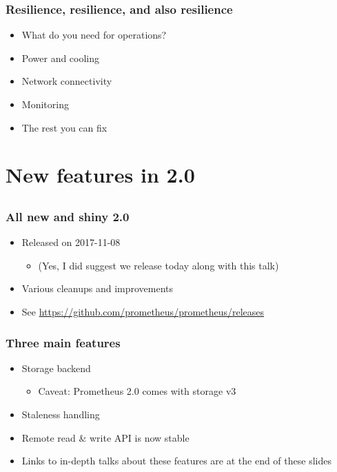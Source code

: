 \documentclass[t]{beamer}
\begin{document}
\begin{frame}
	\frametitle{Resilience, resilience, and also resilience}
	\begin{itemize}
		\item What do you need for operations?
		\item Power and cooling
		\item Network connectivity
		\item Monitoring
		\item The rest you can fix
	\end{itemize}
\end{frame}


\section{New features in 2.0}
\subsection{}

\begin{frame}
	\frametitle{All new and shiny 2.0}
	\begin{itemize}
		\item Released on 2017-11-08
		\begin{itemize}
			\item (Yes, I did suggest we release today along with this talk)
		\end{itemize}
		\item Various cleanups and improvements
		\item See \url{https://github.com/prometheus/prometheus/releases}
	\end{itemize}
\end{frame}

\begin{frame}
	\frametitle{Three main features}
	\begin{itemize}
		\item Storage backend
		\begin{itemize}
			\item Caveat: Prometheus 2.0 comes with storage v3
		\end{itemize}
		\item Staleness handling
		\item Remote read \& write API is now stable
		\item Links to in-depth talks about these features are at the end of these slides
	\end{itemize}
\end{frame}
\end{document}
